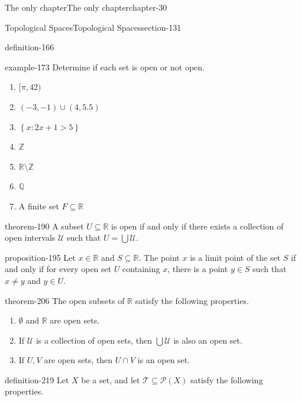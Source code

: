\documentclass[oneside,10pt,]{book}
\newcommand{\mb}{\mathbb}
\newcommand{\mc}{\mathcal}
\newcommand{\setBuilder}[2]{\left\{#1:#2\right\}}
\begin{document}
\begin{chapterptx}{The only chapter}{}{The only chapter}{}{}{chapter-30}
\begin{sectionptx}{Topological Spaces}{}{Topological Spaces}{}{}{section-131}
\begin{definition}{}{definition-166}
\end{definition}
\begin{example}{}{example-173}%
\hypertarget{p-174}{}%
Determine if each set is open or not open.%
\leavevmode%
\begin{enumerate}
\item\hypertarget{li-176}{}\([\pi,42)\)%
\item\hypertarget{li-178}{}\((-3,-1)\cup(4,5.5)\)%
\item\hypertarget{li-180}{}\(\setBuilder{x}{2x+1>5}\)%
\item\hypertarget{li-182}{}\(\mb Z\)%
\item\hypertarget{li-184}{}\(\mb R\setminus\mb Z\)%
\item\hypertarget{li-186}{}\(\mb Q\)%
\item\hypertarget{li-188}{}A finite set \(F\subseteq\mb R\)%
\end{enumerate}
\end{example}
\begin{theorem}{}{}{theorem-190}%
\hypertarget{p-191}{}%
A subset \(U\subseteq\mb R\) is open if and only if there exists a collection of open intervals \(\mc U\) such that \(U=\bigcup\mc U\).%
\end{theorem}
\begin{proposition}{}{}{proposition-195}%
\hypertarget{p-196}{}%
Let \(x\in\mb R\) and \(S\subseteq\mb R\). The point \(x\) is a limit point of the set \(S\) if and only if for every open set \(U\) containing \(x\), there is a point \(y\in S\) such that \(x\not=y\) and \(y\in U\).%
\end{proposition}
\begin{theorem}{}{}{theorem-206}%
\hypertarget{p-207}{}%
The open subsets of \(\mb R\) satisfy the following properties.%
\leavevmode%
\begin{enumerate}
\item\hypertarget{li-210}{}\(\emptyset\) and \(\mb R\) are open sets.%
\item\hypertarget{li-213}{}If \(\mc U\) is a collection of open sets, then \(\bigcup\mc U\) is also an open set.%
\item\hypertarget{li-216}{}If \(U,V\) are open sets, then \(U\cap V\) is an open set.%
\end{enumerate}
\end{theorem}
\begin{definition}{}{definition-219}%
\hypertarget{p-220}{}%
Let \(X\) be a set, and let \(\mc T\subseteq \mc P(X)\) satisfy the following properties.%
\leavevmode%

\end{definition}
\end{sectionptx}
\end{chapterptx}
\end{document}

